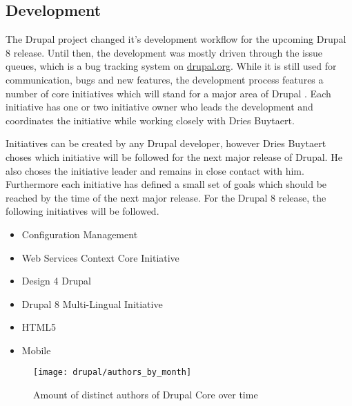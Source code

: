 \subsection{Development} %
\label{sub:Development}

The Drupal project changed it's development workflow for the upcoming Drupal 8
release. Until then, the development was mostly driven through the issue
queues, which is a bug tracking system on \url{drupal.org}. While it is still
used for communication, bugs and new features, the development process features
a number of core initiatives which will stand for a major area of Drupal
\cite{DrupalInitiatives}. Each initiative has one or two initiative owner who
leads the development and coordinates the initiative while working closely with
Dries Buytaert.

Initiatives can be created by any Drupal developer, however Dries Buytaert
choses which initiative will be followed for the next major release of Drupal.
He also choses the initiative leader and remains in close contact with him.
Furthermore each initiative has defined a small set of goals which should be
reached by the time of the next major release. For the Drupal 8 release, the
following initiatives will be followed.

\begin{itemize}
  \item Configuration Management
  \item Web Services Context Core Initiative
  \item Design 4 Drupal
  \item Drupal 8 Multi-Lingual Initiative
  \item HTML5
  \item Mobile
\end{itemize}

\begin{figure}[htbp]
  \centering
  \texttt{[image: drupal/authors\_by\_month]}
  \caption{Amount of distinct authors of Drupal Core over time}
\end{figure}


